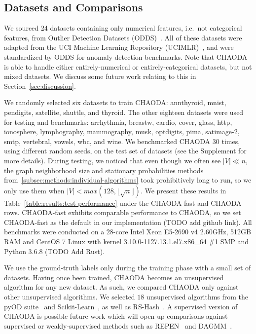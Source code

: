 \subsection{Datasets and Comparisons}
\label{subsec:methods:datasets-and-comparisons}

We sourced 24 datasets containing only numerical features, i.e.\ not categorical features, from Outlier Detection Datasets (ODDS)~\cite{rayana2016odds}.
All of these datasets were adapted from the UCI Machine Learning Repository (UCIMLR)~\cite{UCIMLR}, and were standardized by ODDS for anomaly detection benchmarks.
Note that CHAODA is able to handle either entirely-numerical or entirely-categorical datasets, but not mixed datasets.
We discuss some future work relating to this in Section~\ref{sec:discussion}.

We randomly selected six datasets to train CHAODA: annthyroid, mnist, pendigits, satellite, shuttle, and thyroid.
The other eighteen datasets were used for testing and benchmarks: arrhythmia, breastw, cardio, cover, glass, http, ionosphere, lymphography, mammography, musk, optdigits, pima, satimage-2, smtp, vertebral, vowels, wbc, and wine.
We benchmarked CHAODA 30 times, using different random seeds, on the test set of datasets (see the Supplement for more details).
During testing, we noticed that even though we often see $|V| \ll n $, the graph neighborhood size and stationary probabilities methods from~\ref{subsec:methods:individual-algorithms} took prohibitively long to run, so we only use them when $|V| < max(128, \lfloor \sqrt n \rfloor)$.
We present these results in Table~\ref{table:results:test-performance} under the CHAODA-fast and CHAODA rows.
CHAODA-fast exhibits comparable performance to CHAODA, so we set CHAODA-fast as the default in our implementation (TODO add github link).
All benchmarks were conducted on a 28-core Intel Xeon E5-2690 v4 2.60GHz, 512GB RAM and CentOS 7 Linux with kernel 3.10.0-1127.13.1.el7.x86\_64 \#1 SMP and Python 3.6.8 (TODO Add Rust).

We use the ground-truth labels only during the training phase with a small set of datasets.
Having once been trained, CHAODA becomes an unsupervised algorithm for any new dataset.
As such, we compared CHAODA only against other unsupervised algorithms.
We selected $18$ unsupervised algorithms from the pyOD suite~\cite{zhao2019pyod} and Scikit-Learn~\cite{pedregosa2011scikit}, as well as RS-Hash~\cite{sathe2016subspace}.
A supervised version of CHAODA is possible future work which will open up comparisons against supervised or weakly-supervised methods such as REPEN~\cite{pang2018learning} and DAGMM~\cite{zong2018deep}.
